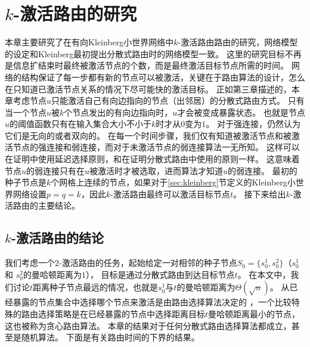 \chapter{$k$-激活路由的研究}

\def \doubleto {\stackrel{ \geq 2}{\longrightarrow}}

本章主要研究了在有向Kleinberg小世界网络中$k$-激活路由路由的研究，网络模型的设定和Kleinberg最初提出分散式路由时的网络模型一致\cite{Kleinberg2000small}。
这里的研究目标不再是信息扩结束时最终被激活节点的个数，而是最终激活目标节点所需的时间。
网络的结构保证了每一步都有新的节点可以被激活，关键在于路由算法的设计，怎么在只知道已激活节点关系的情况下尽可能快的激活目标。
正如第三章描述的，本章考虑节点$u$只能激活自己有向边指向的节点（出邻居）的分散式路由方式。
只有当一个节点$u$被$k$个节点发出的有向边指向时，$u$才会被变成暴露状态。
也就是节点$u$的阈值函数只有在输入集合大小不小于$k$时才从$0$变为$1$。
对于强连接，仍然认为它们是无向的或者双向的。
在每一个时间步骤，我们仅有知道被激活节点和被激活节点的强连接和弱连接，而对于未激活节点的弱连接算法一无所知。
这样可以在证明中使用延迟选择原则\cite{Motwani1995randomized}，和\cite{Kleinberg2000small}在证明分散式路由中使用的原则一样。
这意味着节点$u$的弱连接只有在$u$被激活时才被选取，进而算法才知道$u$的弱连接。
最初的种子节点是$k$个网格上连续的节点，如果对于\ref{sec:kleinberg}节定义的Kleinberg小世界网络设置$p = q = k$，因此$k$-激活路由最终可以激活目标节点$t$。
接下来给出$k$-激活路由的主要结论。

\section{$k$-激活路由的结论} \label{sec:routing}

我们考虑一个$2$-激活路由的任务，起始给定一对相邻的种子节点$S_0 = \{s_0^1, s_0^2\}$（$s_0^1$ 和 $s_0^2$的曼哈顿距离为$1$），
目标是通过分散式路由到达目标节点$t$。
在本文中，我们讨论$t$距离种子节点最远的情况，也就是$s_0^1$与$t$的曼哈顿距离为$\Theta(\sqrt{n})$。
从已经暴露的节点集合中选择哪个节点来激活是由路由选择算法决定的
，一个比较特殊的路由选择策略是在已经暴露的节点中选择距离目标$t$曼哈顿距离最小的节点，这也被称为贪心路由算法。
本章的结果对于任何分散式路由选择算法都成立，甚至是随机算法。
下面是有关路由时间的下界的结果。



